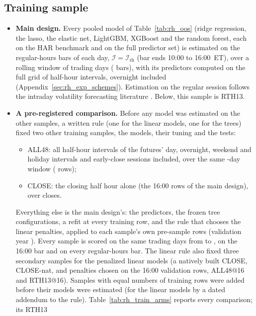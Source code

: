 \subsection{Training sample}
\label{app:rh_robust_train}
\begin{itemize}
\item \textbf{Main design.} Every pooled model of Table~\ref{tab:rh_oos} (ridge regression, the lasso, the elastic
  net, LightGBM, XGBoost and the random forest, each on the HAR benchmark and on the full predictor set) is estimated
  on the \rhtaNBarsDay{} regular-hours bars of each day, $\mathcal I = \mathcal I_{\mathrm{rh}}$ (bar ends 10:00 to
  16:00~ET), over a rolling window of \rhtaWinDays{} trading days (\rhtaRowsRth{} bars), with its predictors
  computed on the full grid of \rhtaNIntervals{} half-hour intervals, overnight included
  (Appendix~\ref{sec:rh_exp_schemes}). Estimation on the regular session follows the intraday volatility
  forecasting literature \citep{EngleSokalska2012,ZhangZhangCucuringuQian2024}. Below, this sample is RTH13.
\item \textbf{A pre-registered comparison.} Before any model was estimated on the other samples, a written rule (one
  for the linear models, one for the trees) fixed two other training samples, the models, their tuning and the tests:
  \begin{itemize}
  \item ALL48: all \rhtaNIntervals{} half-hour intervals of the futures' day, overnight, weekend and holiday
    intervals and early-close sessions included, over the same \rhtaWinDays-day window (\rhtaRowsAll{} rows);
  \item CLOSE: the closing half hour alone (the 16:00 rows of the main design), over \rhtaRowsCl{} closes.
  \end{itemize}
  Everything else is the main design's: the predictors, the frozen tree configurations, a refit at every training
  row, and the rule that chooses the linear penalties, applied to each sample's own pre-sample rows (validation year
  \rhtaValYear). Every sample is scored on the same \rhtaNdays{} trading days from \rhtaStart{} to \rhtaEnd, on the
  16:00 bar and on every regular-hours bar. The linear rule also fixed three secondary samples for the penalized
  linear models (a natively built CLOSE, CLOSE-nat, and penalties chosen on the 16:00 validation rows, ALL48@16 and
  RTH13@16). Samples with equal numbers of training rows were added before their models were estimated (for the
  linear models by a dated addendum to the rule). Table~\ref{tab:rh_train_arms} reports every comparison; its RTH13

\end{itemize}
